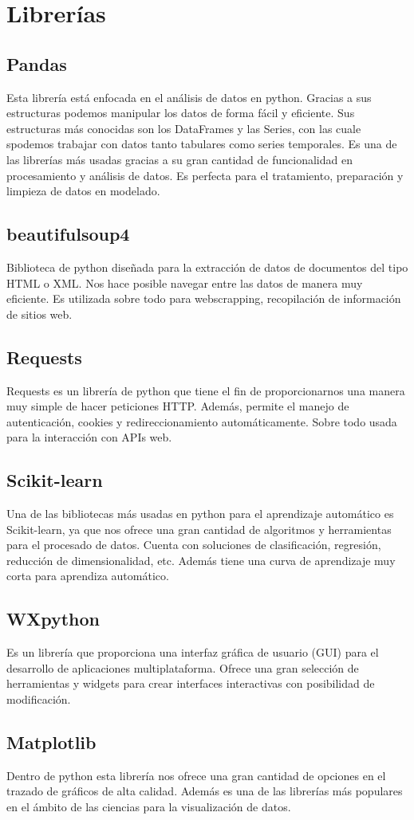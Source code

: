 \section{Librerías}

\subsection{Pandas}
Esta librería está enfocada en el análisis de datos en python. Gracias a sus estructuras podemos manipular los datos de forma fácil y eficiente. Sus estructuras más conocidas son los DataFrames y las Series, con las cuale spodemos trabajar con datos tanto tabulares como series temporales. Es una de las librerías más usadas gracias a su gran cantidad de funcionalidad en procesamiento y análisis de datos. Es perfecta para el tratamiento, preparación y limpieza de datos en modelado.

\subsection{beautifulsoup4}
Biblioteca de python diseñada para la extracción de datos de documentos del tipo HTML o XML. Nos hace posible navegar entre las datos de manera muy eficiente. Es utilizada sobre todo para webscrapping, recopilación de información de sitios web. 


\subsection{Requests}
Requests es un librería de python que tiene el fin de proporcionarnos una manera muy simple de hacer peticiones HTTP. Además, permite el manejo de autenticación, cookies y redireccionamiento automáticamente. Sobre todo usada para la interacción con APIs web.

\subsection{Scikit-learn}
Una de las bibliotecas más usadas en python para el aprendizaje automático es Scikit-learn, ya que nos ofrece una gran cantidad de algoritmos y herramientas para el procesado de datos. Cuenta con soluciones de clasificación, regresión, reducción de dimensionalidad, etc. Además tiene una curva de aprendizaje muy corta para aprendiza automático.

\subsection{WXpython}
Es un librería que proporciona una interfaz gráfica de usuario (GUI) para el desarrollo de aplicaciones multiplataforma. Ofrece una gran selección de herramientas y widgets para crear interfaces interactivas con posibilidad de modificación.

\subsection{Matplotlib}
Dentro de python esta librería nos ofrece una gran cantidad de opciones en el trazado de gráficos de alta calidad. Además es una de las librerías más populares en el ámbito de las ciencias para la visualización de datos.
